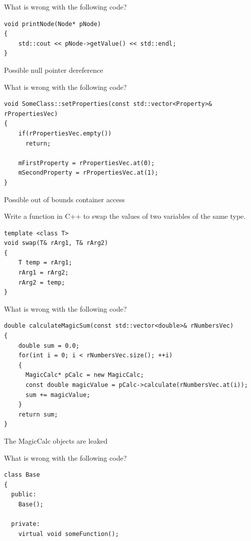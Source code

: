 \documentclass{exam}%
\begin{document}
\begin{questions}
\question What is wrong with the following code?
\begin{lstlisting}
void printNode(Node* pNode)
{
    std::cout << pNode->getValue() << std::endl;
}
\end{lstlisting}
\begin{solution}[.2in]
Possible null pointer dereference
\end{solution}

\question What is wrong with the following code?
\begin{lstlisting}
void SomeClass::setProperties(const std::vector<Property>& rPropertiesVec)
{
    if(rPropertiesVec.empty())
      return;

    mFirstProperty = rPropertiesVec.at(0);
    mSecondProperty = rPropertiesVec.at(1);
}
\end{lstlisting}
\begin{solution}[.2in]
Possible out of bounds container access
\end{solution}

\question Write a function in C++ to swap the values of two variables of the same type.
\begin{solution}[.2in]
\begin{lstlisting}
template <class T>
void swap(T& rArg1, T& rArg2)
{
    T temp = rArg1;
    rArg1 = rArg2;
    rArg2 = temp;
}
\end{lstlisting}
\end{solution}

\question What is wrong with the following code?
\begin{lstlisting}
double calculateMagicSum(const std::vector<double>& rNumbersVec)
{
    double sum = 0.0;
    for(int i = 0; i < rNumbersVec.size(); ++i)
    {
      MagicCalc* pCalc = new MagicCalc;
      const double magicValue = pCalc->calculate(rNumbersVec.at(i));
      sum += magicValue;
    }
    return sum;
}
\end{lstlisting}
\begin{solution}[.2in]
The MagicCalc objects are leaked
\end{solution}

\question What is wrong with the following code?
\begin{lstlisting}
class Base
{
  public:
    Base();

  private:
    virtual void someFunction();


\end{lstlisting}
\end{questions}
\end{document}
